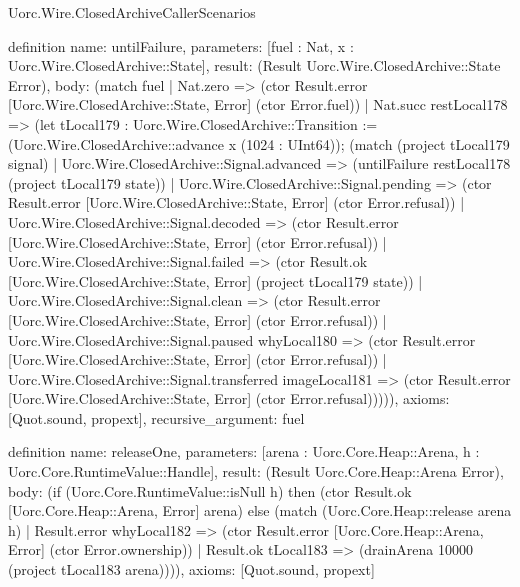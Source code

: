 \begin{lexlean}{Uorc.Wire.ClosedArchiveCallerScenarios}
\begin{semanticmodule}
definition{
  name: untilFailure,
  parameters: [fuel : Nat, x : Uorc.Wire.ClosedArchive::State],
  result: (Result Uorc.Wire.ClosedArchive::State Error),
  body: (match fuel
    | Nat.zero => (ctor Result.error [Uorc.Wire.ClosedArchive::State, Error] (ctor Error.fuel))
    | Nat.succ restLocal178 => (let tLocal179 : Uorc.Wire.ClosedArchive::Transition := (Uorc.Wire.ClosedArchive::advance x (1024 : UInt64)); (match (project tLocal179 signal)
      | Uorc.Wire.ClosedArchive::Signal.advanced => (untilFailure restLocal178 (project tLocal179 state))
      | Uorc.Wire.ClosedArchive::Signal.pending => (ctor Result.error [Uorc.Wire.ClosedArchive::State, Error] (ctor Error.refusal))
      | Uorc.Wire.ClosedArchive::Signal.decoded => (ctor Result.error [Uorc.Wire.ClosedArchive::State, Error] (ctor Error.refusal))
      | Uorc.Wire.ClosedArchive::Signal.failed => (ctor Result.ok [Uorc.Wire.ClosedArchive::State, Error] (project tLocal179 state))
      | Uorc.Wire.ClosedArchive::Signal.clean => (ctor Result.error [Uorc.Wire.ClosedArchive::State, Error] (ctor Error.refusal))
      | Uorc.Wire.ClosedArchive::Signal.paused whyLocal180 => (ctor Result.error [Uorc.Wire.ClosedArchive::State, Error] (ctor Error.refusal))
      | Uorc.Wire.ClosedArchive::Signal.transferred imageLocal181 => (ctor Result.error [Uorc.Wire.ClosedArchive::State, Error] (ctor Error.refusal))))),
  axioms: [Quot.sound, propext],
  recursive_argument: fuel
}

definition{
  name: releaseOne,
  parameters: [arena : Uorc.Core.Heap::Arena, h : Uorc.Core.RuntimeValue::Handle],
  result: (Result Uorc.Core.Heap::Arena Error),
  body: (if (Uorc.Core.RuntimeValue::isNull h) then (ctor Result.ok [Uorc.Core.Heap::Arena, Error] arena) else (match (Uorc.Core.Heap::release arena h)
    | Result.error whyLocal182 => (ctor Result.error [Uorc.Core.Heap::Arena, Error] (ctor Error.ownership))
    | Result.ok tLocal183 => (drainArena 10000 (project tLocal183 arena)))),
  axioms: [Quot.sound, propext]
}


\end{semanticmodule}
\end{lexlean}
